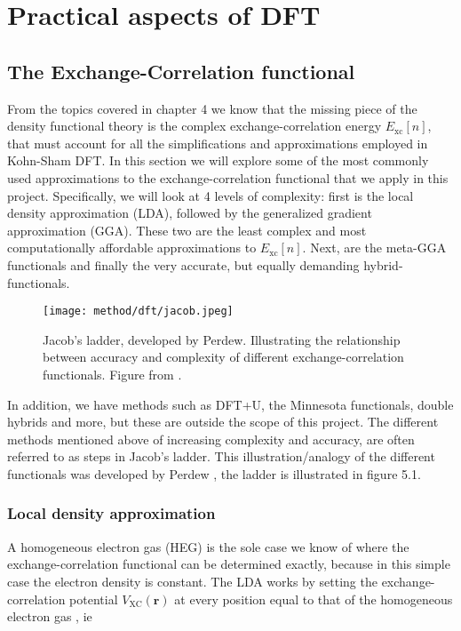 \chapter{Practical aspects of DFT}
\label{sec:Practical DFT}

\section{The Exchange-Correlation functional}
From the topics covered in chapter 4 we know that the missing piece of the density functional theory is the complex exchange-correlation energy $E_{\text{xc}}[n]$, that must account for all the simplifications and approximations employed in Kohn-Sham DFT. In this section we will explore some of the most commonly used approximations to the exchange-correlation functional that we apply in this project. Specifically, we will look at 4 levels of complexity: first is the local density approximation (LDA), followed by the generalized gradient approximation (GGA). These two are the least complex and most computationally affordable approximations to $E_{\text{xc}}[n]$. Next, are the meta-GGA functionals and finally the very accurate, but equally demanding hybrid-functionals.

\begin{figure}[H]
\centering
\texttt{[image: method/dft/jacob.jpeg]}
\caption{Jacob's ladder, developed by Perdew. Illustrating the relationship between accuracy and complexity of different exchange-correlation functionals. Figure from \cite{jacob}.}
\end{figure}

In addition, we have methods such as DFT+U, the Minnesota functionals, double hybrids and more, but these are outside the scope of this project. The different methods mentioned above of increasing complexity and accuracy, are often referred to as steps in Jacob's ladder. This illustration/analogy of the different functionals was developed by Perdew \cite{jacob}, the ladder is illustrated in figure 5.1.


\subsection{Local density approximation}
A homogeneous electron gas (HEG) is the sole case we know of where the exchange-correlation functional can be determined exactly, because in this simple case the electron density is constant. The LDA works by setting the exchange-correlation potential $V_\text{XC}(\boldsymbol{r})$ at every position equal to that of the homogeneous electron gas \cite{persson2020}, ie

